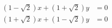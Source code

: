 \begin{align*}
 (1-\sqrt{2})x + (1+\sqrt{2})y &= 0\\
(1+\sqrt{2})x + (1-\sqrt{2})y &= 0
\end{align*}
